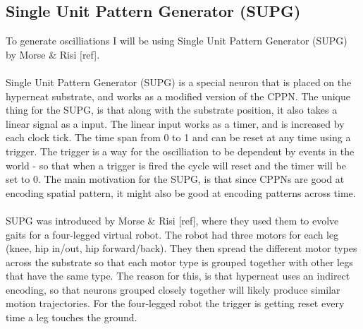 \subsection{Single Unit Pattern Generator (SUPG)}
To generate oscilliations I will be using Single Unit Pattern Generator (SUPG) by Morse \& Risi [ref].
\\
\\
Single Unit Pattern Generator (SUPG) is a special neuron that is placed on the hyperneat substrate, and works as a modified version of the CPPN. The unique thing for the SUPG, is that along with the substrate position, it also takes a linear signal as a input. The linear input works as a timer, and is increased by each clock tick. The time span from 0 to 1 and can be reset at any time using a trigger. The trigger is a way for the oscilliation to be dependent by events in the world - so that when a trigger is fired the cycle will reset and the timer will be set to 0. The main motivation for the SUPG, is that since CPPNs are good at encoding spatial pattern, it might also be good at encoding patterns across time.
\\
\\
SUPG was introduced by Morse \& Risi [ref], where they used them to evolve gaits for a four-legged virtual robot. The robot had three motors for each leg (knee, hip in/out, hip forward/back). They then spread the different motor types across the substrate so that each motor type is grouped together with other legs that have the same type. The reason for this, is that hyperneat uses an indirect encoding, so that neurons grouped closely together will likely produce similar motion trajectories. For the four-legged robot the trigger is getting reset every time a leg touches the ground.
